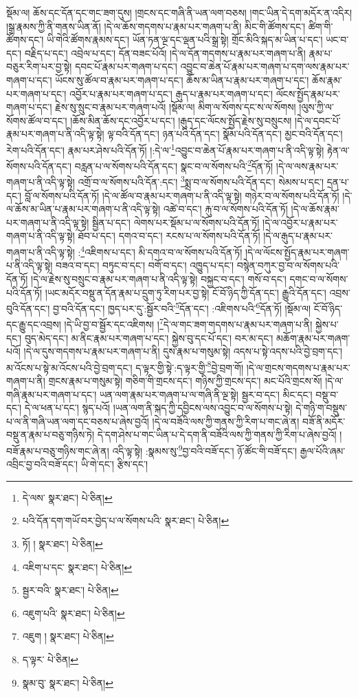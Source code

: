 སྡོམ་ལ། ཆོས་དང་དོན་དང་གང་ཟག་དུས། །གྲངས་དང་གཞི་ནི་ཡན་ལག་བཅས། །གང་ཡིན་དེ་དག་མདོར་ན་འདིར། །སྒྲ་རྣམས་ཀྱི་ནི་གནས་ཡིན་ནོ། །དེ་ལ་ཆོས་གདགས་པ་རྣམ་པར་གཞག་པ་ནི། མིང་གི་ཚོགས་དང་། ཚིག་གི་ཚོགས་དང་། ཡི་གེའི་ཚོགས་རྣམས་དང་། ཡོན་ཏན་ལྔ་དང་ལྡན་པའི་སྒྲ་སྟེ། གྲོང་མིའི་སྐད་མ་ཡིན་པ་དང་། ཡང་བ་དང་། བརྗིད་པ་དང་། འབྲེལ་པ་དང་། དོན་བཟང་པོའོ། །དེ་ལ་དོན་གདགས་པ་རྣམ་པར་གཞག་པ་ནི། རྣམ་པ་བཅུར་རིག་པར་བྱ་སྟེ། དབང་པོ་རྣམ་པར་གཞག་པ་དང་། འབྱུང་བ་ཆེན་པོ་རྣམ་པར་གཞག་པ་དག་ལས་རྣམ་པར་གཞག་པ་དང་། ཡོངས་སུ་ཚོལ་བ་རྣམ་པར་གཞག་པ་དང་། ཆོས་མ་ཡིན་པ་རྣམ་པར་གཞག་པ་དང་། ཆོས་རྣམ་པར་གཞག་པ་དང་། འབྱོར་པ་རྣམ་པར་གཞག་པ་དང་། རྒུད་པ་རྣམ་པར་གཞག་པ་དང་། ལོངས་སྤྱོད་རྣམ་པར་གཞག་པ་དང་། རྗེས་སུ་སྲུང་བ་རྣམ་པར་གཞག་པའོ། །སྡོམ་ལ། མིག་ལ་སོགས་དང་ས་ལ་སོགས། །ལུས་ཀྱི་ལ་སོགས་ཚོལ་བ་དང་། །ཆོས་མིན་ཆོས་དང་འབྱོར་པ་དང་། །རྒུད་དང་ལོངས་སྤྱོད་རྗེས་སུ་བསྲུངས། །དེ་ལ་དབང་པོ་རྣམ་པར་གཞག་པ་ནི་འདི་ལྟ་སྟེ། ལྟ་བའི་དོན་དང་། ཉན་པའི་དོན་དང་། སྣོམ་པའི་དོན་དང་། མྱང་བའི་དོན་དང་། རེག་པའི་དོན་དང་། རྣམ་པར་ཤེས་པའི་དོན་ཏོ། །:དེ་ལ་\footnote{དེ་ལས་  སྣར་ཐང་།  པེ་ཅིན། }འབྱུང་བ་ཆེན་པོ་རྣམ་པར་གཞག་པ་ནི་འདི་ལྟ་སྟེ། རྟེན་ལ་སོགས་པའི་དོན་དང་། བརླན་པ་ལ་སོགས་པའི་དོན་དང་། སྣང་བ་ལ་སོགས་པའི་\footnote{པའི་དོན་དག་གཡོ་བར་བྱེད་པ་ལ་སོགས་པའི་  སྣར་ཐང་།  པེ་ཅིན། }དོན་ཏོ། །དེ་ལ་ལས་རྣམ་པར་གཞག་པ་ནི་འདི་ལྟ་སྟེ། འགྲོ་བ་ལ་སོགས་པའི་དོན་:དང་། \footnote{ཏོ། །   སྣར་ཐང་།  པེ་ཅིན། }སྨྲ་བ་ལ་སོགས་པའི་དོན་དང་། སེམས་པ་དང་། དྲན་པ་དང་། བློ་ལ་སོགས་པའི་དོན་ཏོ། །དེ་ལ་ཚོལ་བ་རྣམ་པར་གཞག་པ་ནི་འདི་ལྟ་སྟེ། གཉེར་བ་ལ་སོགས་པའི་དོན་ཏོ། །དེ་ལ་ཆོས་མ་ཡིན་པ་རྣམ་པར་གཞག་པ་ནི་འདི་ལྟ་སྟེ། འཚེ་བ་དང་། རྐུ་བ་ལ་སོགས་པའི་དོན་ཏོ། །དེ་ལ་ཆོས་རྣམ་པར་གཞག་པ་ནི་འདི་ལྟ་སྟེ། སྦྱིན་པ་དང་། ལེགས་པར་སྡོམ་པ་ལ་སོགས་པའི་དོན་ཏོ། །དེ་ལ་འབྱོར་པ་རྣམ་པར་གཞག་པ་ནི་འདི་ལྟ་སྟེ། ཐོབ་པ་དང་། དགའ་བ་དང་། རངས་པ་ལ་སོགས་པའི་དོན་ཏོ། །དེ་ལ་རྒུད་པ་རྣམ་པར་གཞག་པ་ནི་འདི་ལྟ་སྟེ། :\footnote{འཇིག་པ་དང་  སྣར་ཐང་།  པེ་ཅིན། }འཇིགས་པ་དང་། མི་དགའ་བ་ལ་སོགས་པའི་དོན་ཏོ། །དེ་ལ་ལོངས་སྤྱོད་རྣམ་པར་གཞག་པ་ནི་འདི་ལྟ་སྟེ། བཟའ་བ་དང་། བཏུང་བ་དང་། བགོ་བ་དང་། འཁྱུད་པ་དང་། བསྙེན་བཀུར་བྱ་བ་ལ་སོགས་པའི་དོན་ཏོ། །དེ་ལ་རྗེས་སུ་བསྲུང་བ་རྣམ་པར་གཞག་པ་ནི་འདི་ལྟ་སྟེ། བསྐྱང་བ་དང་། གསོ་བ་དང་། དགང་བ་ལ་སོགས་པའི་དོན་ཏོ། །ཡང་མདོར་བསྡུ་ན་དོན་རྣམ་པ་དྲུག་ཏུ་རིག་པར་བྱ་སྟེ། ངོ་བོ་ཉིད་ཀྱི་དོན་དང་། རྒྱུའི་དོན་དང་། འབྲས་བུའི་དོན་དང་། བྱ་བའི་དོན་དང་། ཁྱད་པར་དུ་:སྦྱོར་བའི་\footnote{སྦྱར་བའི་  སྣར་ཐང་།  པེ་ཅིན། }དོན་དང་། :འཇིགས་པའི་\footnote{འཇུག་པའི་  སྣར་ཐང་།  པེ་ཅིན། }དོན་ཏོ། །སྡོམ་ལ། ངོ་བོ་ཉིད་དང་རྒྱུ་དང་འབྲས། །དེ་ཡི་བྱ་བ་སྦྱོར་དང་འཇིགས། །\footnote{འཇུག །  སྣར་ཐང་།  པེ་ཅིན། }དེ་ལ་གང་ཟག་གདགས་པ་རྣམ་པར་གཞག་པ་ནི། སྐྱེས་པ་དང་། བུད་མེད་དང་། མ་ནིང་རྣམ་པར་གཞག་པ་དང་། སྐྱེས་བུ་དང་པོ་དང་། བར་མ་དང་། མཆོག་རྣམ་པར་གཞག་པའོ། །དེ་ལ་དུས་གདགས་པ་རྣམ་པར་གཞག་པ་ནི། དུས་རྣམ་པ་གསུམ་སྟེ། འདས་པ་སྟེ་འདས་པའི་བྱེ་བྲག་དང་། མ་འོངས་པ་སྟེ་མ་འོངས་པའི་བྱེ་བྲག་དང་། ད་ལྟར་གྱི་སྟེ་:ད་ལྟར་གྱི་\footnote{ད་ལྟར་  པེ་ཅིན། }བྱེ་བྲག་གོ། །དེ་ལ་གྲངས་གདགས་པ་རྣམ་པར་གཞག་པ་ནི། གྲངས་རྣམ་པ་གསུམ་སྟེ། གཅིག་གི་གྲངས་དང་། གཉིས་ཀྱི་གྲངས་དང་། མང་པོའི་གྲངས་སོ། །དེ་ལ་གཞི་རྣམ་པར་གཞག་པ་དང་། ཡན་ལག་རྣམ་པར་གཞག་པ་ལ་གཞི་ནི་ལྔ་སྟེ། སྦྱར་བ་དང་། མིང་དང་། བསྡུ་བ་དང་། དེ་ལ་ཕན་པ་དང་། སྙད་པའོ། །ཡན་ལག་ནི་སྐད་ཀྱི་དབྱིངས་ལས་འབྱུང་བ་ལ་སོགས་པ་སྟེ། དེ་གཉི་ག་བསྡུས་པ་ལ་ནི་གཞི་ཡན་ལག་དང་བཅས་པ་ཞེས་བྱའོ། །དེ་ལ་བཟོའི་ལས་ཀྱི་གནས་ཀྱི་རིག་པ་གང་ཞེ་ན། བཟོ་ནི་མདོར་བསྡུ་ན་རྣམ་པ་བཅུ་གཉིས་ཏེ། དེ་དག་ཤེས་པ་གང་ཡིན་པ་དེ་དག་ནི་བཟོའི་ལས་ཀྱི་གནས་ཀྱི་རིག་པ་ཞེས་བྱའོ། །བཟོ་རྣམ་པ་བཅུ་གཉིས་གང་ཞེ་ན། འདི་ལྟ་སྟེ། :སྣམས་སུ་\footnote{སྣམ་བུ་  སྣར་ཐང་།  པེ་ཅིན། }བྱ་བའི་བཟོ་དང་། ཉོ་ཚོང་གི་བཟོ་དང་། རྒྱལ་པོའི་ཞམ་འབྲིང་བྱ་བའི་བཟོ་དང་། ཡི་གེ་དང་། རྩིས་དང་། 